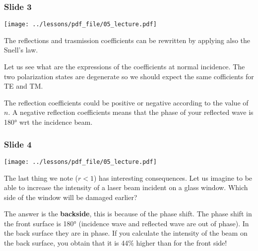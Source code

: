 \documentclass[../main/main.tex]{subfiles}
\begin{document}
\subsubsection*{Slide 3}

\begin{minipage}[]{0.5\linewidth}
\centering
\texttt{[image: ../lessons/pdf\_file/05\_lecture.pdf]}
\end{minipage}
\hspace{0.3cm}\vspace{0.3cm}
\begin{minipage}[c]{0.47\linewidth}

The reflections and trasmission coefficients can be rewritten by applying also the Snell's law.

Let us see what are the expressions of the coefficients at normal incidence. The two polarization states are degenerate so we should expect the same cofficients for TE and TM.

The reflection coefficients could be positive or negative according to the value of \( n \). A negative reflection coefficients means that the phase of your reflected wave is 180° wrt the incidence beam.

\end{minipage}

\newpage

\subsubsection*{Slide 4}

\begin{minipage}[]{0.5\linewidth}
\centering
\texttt{[image: ../lessons/pdf\_file/05\_lecture.pdf]}
\end{minipage}
\hspace{0.3cm}\vspace{0.3cm}
\begin{minipage}[c]{0.47\linewidth}

The last thing we note (\( r<1 \)) has interesting consequences. Let us imagine to be able to increase the intensity of a laser beam incident on a glass window. Which side of the window will be damaged earlier?

The answer is the \textbf{backside}, this is because of the phase shift. The phase shift in the front surface is 180° (incidence wave and reflected wave are out of phase). In the back surface they are in phase. If you calculate the intensity of the beam on the back surface, you obtain that it is 44$\%$ higher than for the front side!

\end{minipage}
\end{document}
